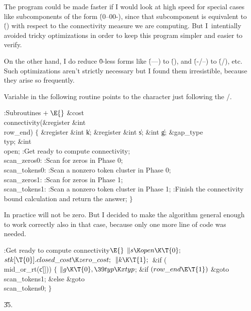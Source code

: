 The program could be made faster if I would look at high speed for
special cases like subcomponents of the form \.{(0--00-)}, since
that subcomponent is equivalent to \.{()} with respect to the
connectivity measure we are computing. But I~intentially avoided tricky
optimizations in order to keep this program simpler and easier to verify.

On the other hand, I do
reduce \.0-less forms like \.{(---)} to \.{()},
and \.{(-\caret/--)} to \.{(\caret/)}, etc.
Such optimizations aren't strictly necessary but I found them irresistible,
because they arise so frequently.

Variable  in the following routine points to the character
just
following the \qcaret/.

\Y\B\4:Subroutines\X${}\mathrel+\E{}$\6
\&{cost} \\{connectivity}(\&{register} \&{int} \\{row\_end})\1\1\2\2\6
${}\{{}$\1\6
\&{register} \&{int} \|k;\6
\&{register} \&{int} \|s;\6
\&{int} \|g;\6
\&{gap\_type} \\{typ};\6
\&{int} \\{open};\7
:Get ready to compute connectivity\X;\6
\4\\{scan\_zeros0}:\5
:Scan for zeros in Phase 0\X;\6
\4\\{scan\_tokens0}:\5
:Scan a nonzero token cluster in Phase 0\X;\6
\4\\{scan\_zeros1}:\5
:Scan for zeros in Phase 1\X;\6
\4\\{scan\_tokens1}:\5
:Scan a nonzero token cluster in Phase 1\X;\6
:Finish the connectivity bound calculation and return the answer\X;\6
\4${}\}{}$\2\par
\fi

In practice  will not be zero. But I
decided to make the algorithm
general enough to work correctly also in that case, because only one more
line of code was needed.

\Y\B\4:Get ready to compute connectivity\X${}\E{}$\6
$\|s\K\\{open}\K\T{0};{}$\6
${}\\{stk}[\T{0}].\\{closed\_cost}\K\\{zero\_cost};{}$\6
${}\|k\K\T{1};{}$\6
\&{if} (\\{mid\_or\_rt}(\|c[]))\5
${}\{{}$\1\6
${}\|g\K\T{0},\39\\{typ}\K\\{xtyp}{}$;\6
\&{if} ${}(\\{row\_end}\E\T{1}){}$\1\5
\&{goto} \\{scan\_tokens1};\2\6
\&{else}\1\5
\&{goto} \\{scan\_tokens0};\2\6
\4${}\}{}$\2\par
\U35.\fi

